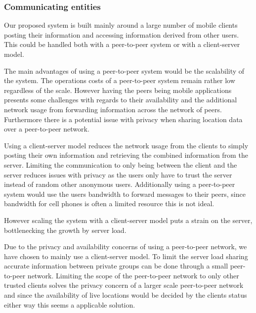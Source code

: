 \subsubsection{Communicating entities}


Our proposed system is built mainly around a large number of mobile clients posting their information and accessing information derived from other users. This could be handled both with a peer-to-peer system or with a client-server model. 

The main advantages of using a peer-to-peer system would be the scalability of the system. The operations costs of a peer-to-peer system remain rather low regardless of the scale. However having the peers being mobile applications presents some challenges with regards to their availability and the additional network usage from forwarding information across the network of peers. Furthermore there is a potential issue with privacy when sharing location data over a peer-to-peer network.

Using a client-server model reduces the network usage from the clients to simply posting their own information and retrieving the combined information from the server. Limiting the communication to only being between the client and the server reduces issues with privacy as the users only have to trust the server instead of random other anonymous users. Additionally using a peer-to-peer system would use the users bandwidth to forward messages to their peers, since bandwidth for cell phones is often a limited resource this is not ideal.

However scaling the system with a client-server model puts a strain on the server, bottlenecking the growth by server load. 

Due to the privacy and availability concerns of using a peer-to-peer network, we have chosen to mainly use a client-server model. To limit the server load sharing accurate information between private groups can be done through a small peer-to-peer network. 
Limiting the scope of the peer-to-peer network to only other trusted clients solves the privacy concern of a larger scale peer-to-peer network and since the availability of live locations would be decided by the clients status either way this seems a applicable solution. %
